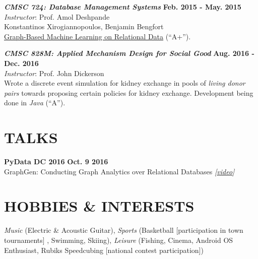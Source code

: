 \documentclass[margin, 10pt]{res} %
\begin{document}
\begin{resume}
{\sl \textbf{CMSC 724: Database Management Systems}} \hfill \textbf{Feb. 2015 - May. 2015}\\
\textit{Instructor}: Prof. Amol Deshpande\\
Konstantinos Xirogiannopoulos, Benjamin Bengfort\\
\href{https://drive.google.com/open?id=0B20MIwp_I7FlUGhyVmFYcjFuYmM}{Graph-Based Machine Learning on Relational Data} (``A+'').

{\sl \textbf{CMSC 828M: Applied Mechanism Design for Social Good}} \hfill \textbf{Aug. 2016 - Dec. 2016}\\
\textit{Instructor}: Prof. John Dickerson\\
Wrote a discrete event simulation for kidney exchange in pools of \textit{living donor pairs} towards proposing certain policies for kidney exchange.
Development being done in \textit{Java} (``A'').


\section{TALKS}
 \textbf{PyData DC 2016}  \hfill \textbf{Oct. 9 2016}\\
GraphGen: Conducting Graph Analytics over Relational Databases \textit{[\href{https://youtu.be/3pAfRiGmk9o?t=24s}{video}]}

\section{HOBBIES \& INTERESTS}

\textit{Music} (Electric \& Acoustic Guitar), \textit{Sports} (Basketball [participation in town tournaments] , Swimming, Skiing), \textit{Leisure} (Fishing, Cinema, Android OS Enthusiast, Rubiks Speedcubing [national contest participation])


\end{resume}
\end{document}
